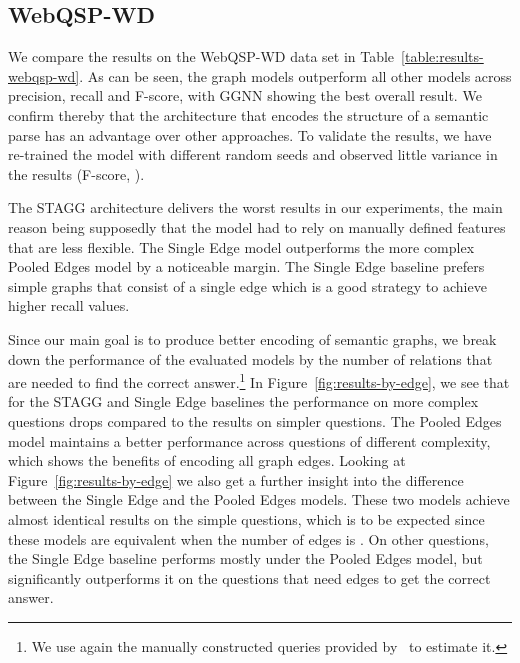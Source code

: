 \documentclass[11pt]{article}
\begin{document}
\subsection{WebQSP-WD} 

We compare the results on the WebQSP-WD data set in Table~\ref{table:results-webqsp-wd}. As can be seen, the graph models outperform all other models across precision, recall and F-score, with GGNN showing the best overall result. We confirm thereby that the architecture that encodes the structure of a semantic parse has an advantage over other approaches. To validate the results, we have re-trained the model with different random seeds and observed little variance in the results (F-score, ).

The STAGG architecture delivers the worst results in our experiments, the main reason being supposedly that the model had to rely on manually defined features that are less flexible. The Single Edge model outperforms the more complex Pooled Edges model by a noticeable margin. The Single Edge baseline prefers simple graphs that consist of a single edge which is a good strategy to achieve higher recall values. 

Since our main goal is to produce better encoding of semantic graphs, we break down the performance of the evaluated models by the number of relations that are needed to find the correct answer.\footnote{We use again the manually constructed queries provided by~ to estimate it.} In Figure~\ref{fig:results-by-edge}, we see that for the STAGG and Single Edge baselines the performance on more complex questions drops compared to the results on simpler questions. The Pooled Edges model maintains a better performance across questions of different complexity, which shows the benefits of encoding all graph edges. 
Looking at Figure~\ref{fig:results-by-edge} we also get a further insight into the difference between the Single Edge and the Pooled Edges models. These two models achieve almost identical results on the simple questions, which is to be expected since these models are equivalent when the number of edges is . On other questions, the Single Edge baseline performs mostly under the Pooled Edges model, but significantly outperforms it on the questions that need  edges to get the correct answer.
\end{document}
